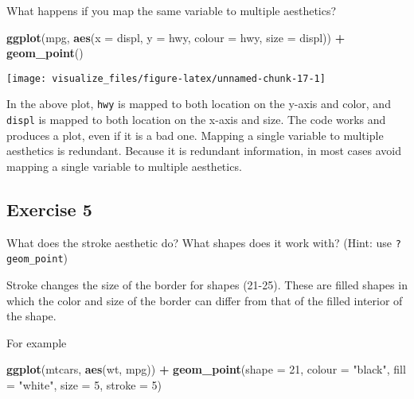 \documentclass[]{book}
\newenvironment{Shaded}{\begin{snugshade}}{\end{snugshade}}
\newcommand{\DataTypeTok}[1]{\textcolor[rgb]{0.13,0.29,0.53}{#1}}
\newcommand{\DecValTok}[1]{\textcolor[rgb]{0.00,0.00,0.81}{#1}}
\newcommand{\KeywordTok}[1]{\textcolor[rgb]{0.13,0.29,0.53}{\textbf{#1}}}
\newcommand{\NormalTok}[1]{#1}
\newcommand{\OperatorTok}[1]{\textcolor[rgb]{0.81,0.36,0.00}{\textbf{#1}}}
\newcommand{\StringTok}[1]{\textcolor[rgb]{0.31,0.60,0.02}{#1}}
\theoremstyle{plain}
\theoremstyle{remark}
\theoremstyle{definition}
\theoremstyle{definition}
\theoremstyle{definition}
\theoremstyle{remark}
\begin{document}
What happens if you map the same variable to multiple aesthetics?

\begin{Shaded}
\begin{Highlighting}[]
\KeywordTok{ggplot}\NormalTok{(mpg, }\KeywordTok{aes}\NormalTok{(}\DataTypeTok{x =}\NormalTok{ displ, }\DataTypeTok{y =}\NormalTok{ hwy, }\DataTypeTok{colour =}\NormalTok{ hwy, }\DataTypeTok{size =}\NormalTok{ displ)) }\OperatorTok{+}
\StringTok{  }\KeywordTok{geom_point}\NormalTok{()}
\end{Highlighting}
\end{Shaded}

\begin{center}\texttt{[image: visualize\_files/figure-latex/unnamed-chunk-17-1]} \end{center}

In the above plot, \texttt{hwy} is mapped to both location on the y-axis
and color, and \texttt{displ} is mapped to both location on the x-axis
and size. The code works and produces a plot, even if it is a bad one.
Mapping a single variable to multiple aesthetics is redundant. Because
it is redundant information, in most cases avoid mapping a single
variable to multiple aesthetics.

\hypertarget{exercise-5}{%
\subsection{Exercise 5}\label{exercise-5}}

What does the stroke aesthetic do? What shapes does it work with? (Hint:
use \texttt{?geom\_point})

Stroke changes the size of the border for shapes (21-25). These are
filled shapes in which the color and size of the border can differ from
that of the filled interior of the shape.

For example

\begin{Shaded}
\begin{Highlighting}[]
\KeywordTok{ggplot}\NormalTok{(mtcars, }\KeywordTok{aes}\NormalTok{(wt, mpg)) }\OperatorTok{+}
\StringTok{  }\KeywordTok{geom_point}\NormalTok{(}\DataTypeTok{shape =} \DecValTok{21}\NormalTok{, }\DataTypeTok{colour =} \StringTok{"black"}\NormalTok{, }\DataTypeTok{fill =} \StringTok{"white"}\NormalTok{, }\DataTypeTok{size =} \DecValTok{5}\NormalTok{, }\DataTypeTok{stroke =} \DecValTok{5}\NormalTok{)}
\end{Highlighting}
\end{Shaded}
\end{document}
